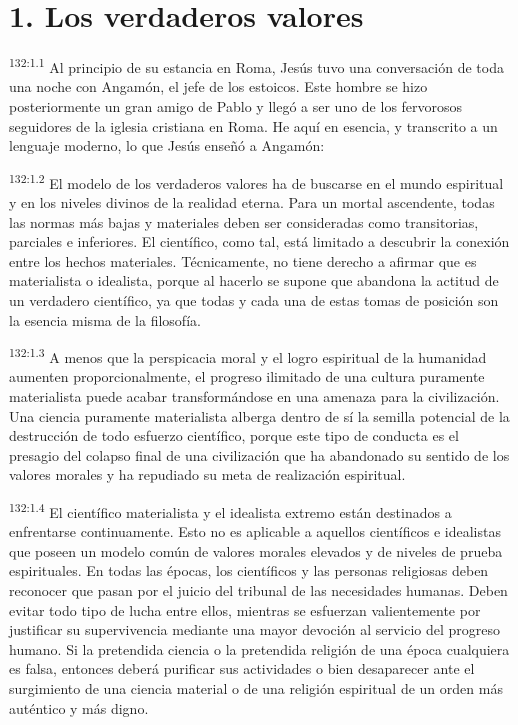 \section*{1. Los verdaderos valores}
\par 
\textsuperscript{132:1.1} Al principio de su estancia en Roma, Jesús tuvo una conversación de toda una noche con Angamón, el jefe de los estoicos. Este hombre se hizo posteriormente un gran amigo de Pablo y llegó a ser uno de los fervorosos seguidores de la iglesia cristiana en Roma. He aquí en esencia, y transcrito a un lenguaje moderno, lo que Jesús enseñó a Angamón:

\par 
\textsuperscript{132:1.2} El modelo de los verdaderos valores ha de buscarse en el mundo espiritual y en los niveles divinos de la realidad eterna. Para un mortal ascendente, todas las normas más bajas y materiales deben ser consideradas como transitorias, parciales e inferiores. El científico, como tal, está limitado a descubrir la conexión entre los hechos materiales. Técnicamente, no tiene derecho a afirmar que es materialista o idealista, porque al hacerlo se supone que abandona la actitud de un verdadero científico, ya que todas y cada una de estas tomas de posición son la esencia misma de la filosofía.

\par 
\textsuperscript{132:1.3} A menos que la perspicacia moral y el logro espiritual de la humanidad aumenten proporcionalmente, el progreso ilimitado de una cultura puramente materialista puede acabar transformándose en una amenaza para la civilización. Una ciencia puramente materialista alberga dentro de sí la semilla potencial de la destrucción de todo esfuerzo científico, porque este tipo de conducta es el presagio del colapso final de una civilización que ha abandonado su sentido de los valores morales y ha repudiado su meta de realización espiritual.

\par 
\textsuperscript{132:1.4} El científico materialista y el idealista extremo están destinados a enfrentarse continuamente. Esto no es aplicable a aquellos científicos e idealistas que poseen un modelo común de valores morales elevados y de niveles de prueba espirituales. En todas las épocas, los científicos y las personas religiosas deben reconocer que pasan por el juicio del tribunal de las necesidades humanas. Deben evitar todo tipo de lucha entre ellos, mientras se esfuerzan valientemente por justificar su supervivencia mediante una mayor devoción al servicio del progreso humano. Si la pretendida ciencia o la pretendida religión de una época cualquiera es falsa, entonces deberá purificar sus actividades o bien desaparecer ante el surgimiento de una ciencia material o de una religión espiritual de un orden más auténtico y más digno.

